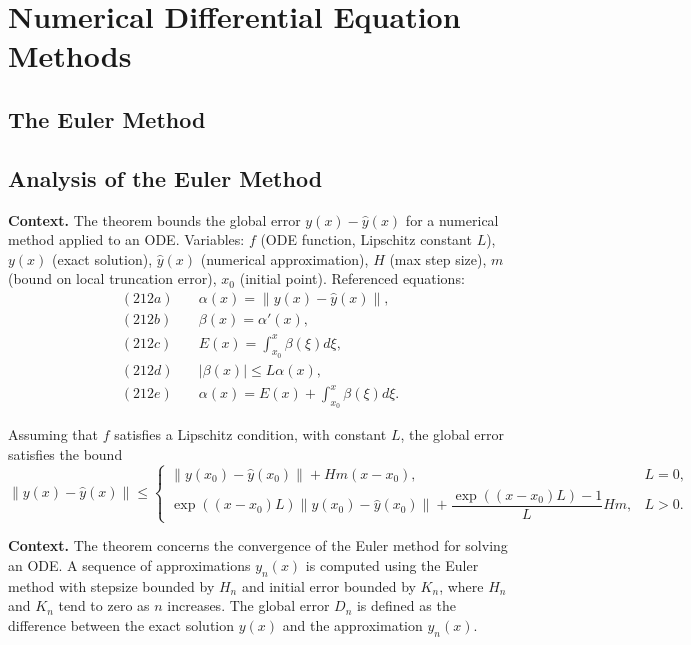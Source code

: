 \chapter{Numerical Differential Equation Methods}

\section{The Euler Method}


\section{Analysis of the Euler Method}

\noindent\textbf{Context.}
The theorem bounds the global error \(y(x)-\widehat{y}(x)\) for a numerical method applied to an ODE.  
Variables: \(f\) (ODE function, Lipschitz constant \(L\)), \(y(x)\) (exact solution), \(\widehat{y}(x)\) (numerical approximation), \(H\) (max step size), \(m\) (bound on local truncation error), \(x_{0}\) (initial point).  
Referenced equations:
\begin{align*}
(212a)&\quad \alpha(x)=\|y(x)-\widehat{y}(x)\|,\\
(212b)&\quad \beta(x)=\alpha'(x),\\
(212c)&\quad E(x)=\int_{x_{0}}^{x}\beta(\xi)d\xi,\\
(212d)&\quad |\beta(x)|\le L\alpha(x),\\
(212e)&\quad \alpha(x)=E(x)+\int_{x_{0}}^{x}\beta(\xi)d\xi.
\end{align*}

\begin{theorem}

  \label{thm:212A}
Assuming that \( f \) satisfies a Lipschitz condition, with constant \( L \), the global error satisfies the bound
\[
\| y(x) - \widehat{y}(x) \| \leq 
\begin{cases}
\| y(x_0) - \widehat{y}(x_0) \| + Hm(x - x_0), & L = 0, \\[6pt]
\exp((x - x_0)L) \| y(x_0) - \widehat{y}(x_0) \| + \dfrac{\exp((x - x_0)L) - 1}{L} Hm, & L > 0.
\end{cases}
\]
\end{theorem}

\noindent\textbf{Context.}
The theorem concerns the convergence of the Euler method for solving an ODE. A sequence of approximations \(y_n(x)\) is computed using the Euler method with stepsize bounded by \(H_n\) and initial error bounded by \(K_n\), where \(H_n\) and \(K_n\) tend to zero as \(n\) increases. The global error \(D_n\) is defined as the difference between the exact solution \(y(x)\) and the approximation \(y_n(x)\).

